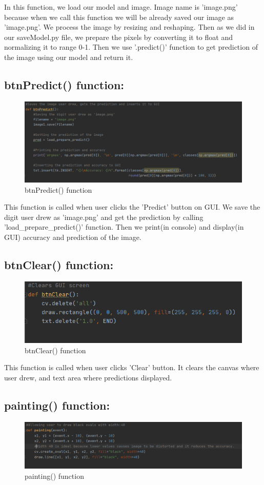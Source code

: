 \documentclass[onecolumn]{article}
\begin{document}
In this function, we load our model and image. Image name is 'image.png' because when we call this function we will be already saved our image as 'image.png'. We process the image by resizing and reshaping. Then as we did in our saveModel.py file, we prepare the pixels by converting it to float and normalizing it to range 0-1. Then we use '.predict()' function to get prediction of the image using our model and return it.
\clearpage

\subsection{btnPredict() function:}
\begin{figure}[h!]
\centering
    \includegraphics[width=0.8\linewidth]{predictbtn.PNG}
\caption{\label{}
btnPredict() function}
\end{figure}

This function is called when user clicks the 'Predict' button on GUI. We save the digit user drew as 'image.png' and get the prediction by calling 'load\_prepare\_predict()' function. Then we print(in console) and display(in GUI) accuracy and prediction of the image.


\subsection{btnClear() function:}
\begin{figure}[h!]
\centering
    \includegraphics[width=0.6\linewidth]{clear.PNG}
\caption{\label{}
btnClear() function}
\end{figure}

This function is called when user clicks 'Clear' button. It clears the canvas where user drew, and text area where predictions displayed.

\subsection{painting() function:}
\begin{figure}[h!]
\centering
    \includegraphics[width=0.6\linewidth]{painting.PNG}
\caption{\label{}
painting() function}
\end{figure}
\end{document}
